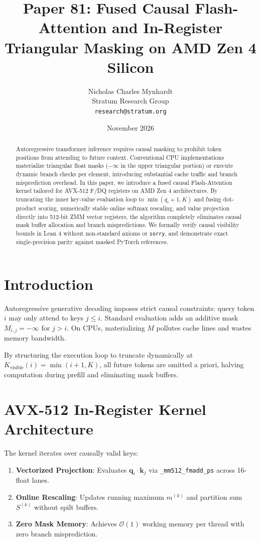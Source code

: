 \documentclass[10pt,twocolumn,letterpaper]{article}
\title{Paper 81: Fused Causal Flash-Attention and In-Register Triangular Masking on AMD Zen 4 Silicon}
\author{Nicholas Charles Mynhardt \\ Stratum Research Group \\ \texttt{research@stratum.org}}
\date{November 2026}
\begin{document}
\maketitle

\begin{abstract}
Autoregressive transformer inference requires causal masking to prohibit token positions from attending to future context. Conventional CPU implementations materialize triangular float masks ($-\infty$ in the upper triangular portion) or execute dynamic branch checks per element, introducing substantial cache traffic and branch misprediction overhead. In this paper, we introduce a fused causal Flash-Attention kernel tailored for AVX-512 F/DQ registers on AMD Zen 4 architectures. By truncating the inner key-value evaluation loop to $\min(q_i + 1, K)$ and fusing dot-product scoring, numerically stable online softmax rescaling, and value projection directly into 512-bit ZMM vector registers, the algorithm completely eliminates causal mask buffer allocation and branch mispredictions. We formally verify causal visibility bounds in Lean 4 without non-standard axioms or \texttt{sorry}, and demonstrate exact single-precision parity against masked PyTorch references.
\end{abstract}

\section{Introduction}
Autoregressive generative decoding imposes strict causal constraints: query token $i$ may only attend to keys $j \le i$. Standard evaluation adds an additive mask $M_{i,j} = -\infty$ for $j > i$. On CPUs, materializing $M$ pollutes cache lines and wastes memory bandwidth.

By structuring the execution loop to truncate dynamically at $K_{\text{visible}}(i) = \min(i + 1, K)$, all future tokens are omitted a priori, halving computation during prefill and eliminating mask buffers.

\section{AVX-512 In-Register Kernel Architecture}
The kernel iterates over causally valid keys:
\begin{enumerate}
    \item \textbf{Vectorized Projection}: Evaluates $\mathbf{q}_i \cdot \mathbf{k}_j$ via \texttt{\_mm512\_fmadd\_ps} across 16-float lanes.
    \item \textbf{Online Rescaling}: Updates running maximum $m^{(k)}$ and partition sum $S^{(k)}$ without spilt buffers.
    \item \textbf{Zero Mask Memory}: Achieves $\mathcal{O}(1)$ working memory per thread with zero branch misprediction.
\end{enumerate}
\end{document}
